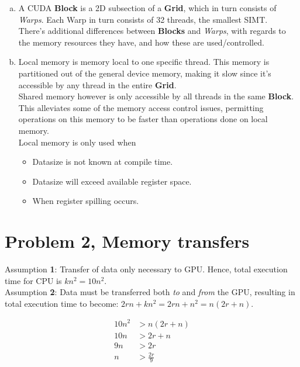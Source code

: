 \documentclass[fontsize=11pt, paper=a4, titlepage]{article}
\begin{document}
\begin{enumerate}[a)]
    \item A CUDA \textbf{Block} is a 2D subsection of a \textbf{Grid}, which in
turn consists of \textit{Warps}. Each Warp in turn consists of 32 threads, the
smallest SIMT. \\

There's additional differences between \textbf{Blocks} and \textit{Warps}, with
regards to the memory resources they have, and how these are used/controlled.

    \item Local memory is memory local to one specific thread. This memory is
partitioned out of the general device memory, making it slow since it's
accessible by any thread in the entire \textbf{Grid}. \\

Shared memory however is only accessible by all threads in the same
\textbf{Block}. This alleviates some of the memory access control issues,
permitting operations on this memory to be faster than operations done on local
memory. \\

Local memory is only used when
    \begin{itemize}
        \item Datasize is not known at compile time.
        \item Datasize will exceed available register space.
        \item When register spilling occurs.
    \end{itemize}

\end{enumerate}

\section*{Problem 2, Memory transfers}
Assumption \textbf{1}: Transfer of data only necessary to GPU. Hence, total
execution time for CPU is $kn^2 = 10n^2$. \\
Assumption \textbf{2}: Data must be transferred both \textit{to} and
\textit{from} the GPU, resulting in total execution time to become: $2rn + kn^2
= 2rn + n^2 = n(2r+n)$.

\begin{align*}
    10n^2 &> n(2r+n) \\
    10n &> 2r+n \\
    9n &> 2r \\
    n &> \frac{2r}{9}
\end{align*}
\end{document}
